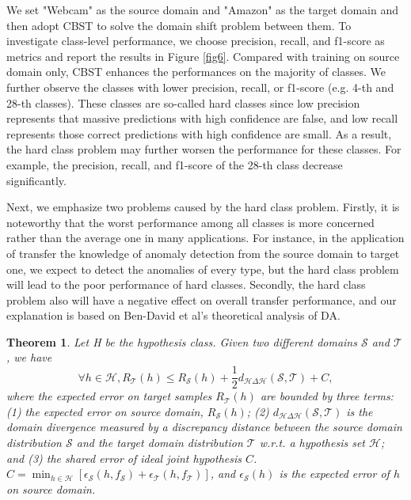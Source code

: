 \documentclass[a4paper,fleqn]{cas-dc}
\newtheorem{theorem}{Theorem}[section]
\begin{document}
	We set "Webcam" as the source domain and "Amazon" as the target domain and then adopt CBST to solve the domain shift problem between them. To investigate class-level performance, we choose precision, recall, and f1-score as metrics and report the results in Figure \ref{fig6}. Compared with training on source domain only, CBST enhances the performances on the majority of classes. We further observe the classes with lower precision, recall, or f1-score (e.g. 4-th and 28-th classes). These classes are so-called hard classes since low precision represents that massive predictions with high confidence are false, and low recall represents those correct predictions with high confidence are small. As a result, the hard class problem may further worsen the performance for these classes. For example, the precision, recall, and f1-score of the 28-th class decrease significantly.  
	
	Next, we emphasize two problems caused by the hard class problem. Firstly, it is noteworthy that the worst performance among all classes is more concerned rather than the average one in many applications. For instance,  in the application of transfer the knowledge of anomaly detection from the source domain to target one, we expect to detect the anomalies of every type, but the hard class problem will lead to the poor performance of hard classes. Secondly, the hard class problem also will have a negative effect on overall transfer performance, and our explanation is based on Ben-David et al's \cite{DBLP:journals/ml/Ben-DavidBCKPV10} theoretical analysis of DA.
	\begin{theorem}
		Let H be the hypothesis class. Given two different domains $\mathcal{S}$ and $\mathcal{T}$, we have
		\begin{equation}
			\forall{h}\in{\mathcal{H}},R_{\mathcal{T}}(h)\leq{R_{\mathcal{S}}(h)}+\frac{1}{2}d_{\mathcal{H}\Delta\mathcal{H}}(\mathcal{S},\mathcal{T})+C\label{eq:bound},
		\end{equation}
		where the expected error on target samples $R_{\mathcal{T}}(h)$ are bounded by three terms: (1) the expected error on source domain, $R_{\mathcal{S}}(h)$; (2) $d_{\mathcal{H}\Delta\mathcal{H}}(\mathcal{S},\mathcal{T})$ is the domain divergence measured by a discrepancy distance between the source domain distribution $\mathcal{S}$ and the target domain distribution $\mathcal{T}$ \emph{w.r.t.} a hypothesis set $\mathcal{H}$; and (3) the shared error of ideal joint hypothesis $C$. $C = \mathop{min}_{h \in {\mathcal{H}}}[\epsilon_{\mathcal{S}}(h, f_{\mathcal{S}}) + \epsilon_{\mathcal{T}}(h, f_{\mathcal{T}})]$, and $\epsilon_{\mathcal{S}}(h)$ is the expected error of $h$ on source domain.
	\end{theorem}
	
\end{document}
